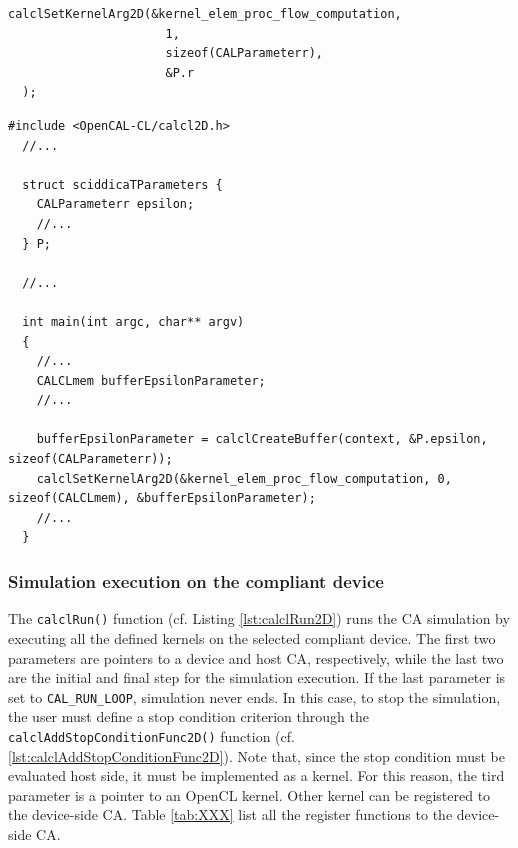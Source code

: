
\begin{lstlisting}[float,floatplacement=H, label=lst:calclSetKernelArg2D, caption=The calclSetKernelArg2D() function., numbers=none]
  calclSetKernelArg2D(&kernel_elem_proc_flow_computation,
                      1,
                      sizeof(CALParameterr),
                      &P.r
  );
\end{lstlisting}


\begin{lstlisting}[float,floatplacement=H, label=lst:calclKernelParameters, caption=Passing parametrs to kernel.]
  #include <OpenCAL-CL/calcl2D.h>
  //...

  struct sciddicaTParameters {
    CALParameterr epsilon;
    //...
  } P;

  //...

  int main(int argc, char** argv)
  {
    //...
    CALCLmem bufferEpsilonParameter;
    //...

    bufferEpsilonParameter = calclCreateBuffer(context, &P.epsilon, sizeof(CALParameterr));
    calclSetKernelArg2D(&kernel_elem_proc_flow_computation, 0, sizeof(CALCLmem), &bufferEpsilonParameter);
    //...
  }
\end{lstlisting}


\subsubsection{Simulation execution on the compliant device}

The \verb'calclRun()' function (cf. Listing \ref{lst:calclRun2D}) runs
the CA simulation by executing all the defined kernels on the selected
compliant device. The first two parameters are pointers to a device
and host CA, respectively, while the last two are the initial and
final step for the simulation execution. If the last parameter is set
to \verb'CAL_RUN_LOOP', simulation never ends. In this case, to stop
the simulation, the user must define a stop condition criterion
through the \verb'calclAddStopConditionFunc2D()' function
(cf. \ref{lst:calclAddStopConditionFunc2D}). Note that, since the stop
condition must be evaluated host side, it must be implemented as a
kernel. For this reason, the tird parameter is a pointer to an OpenCL
kernel. Other kernel can be registered to the device-side CA. Table
\ref{tab:XXX} list all the register functions to the device-side CA.


